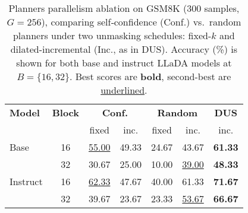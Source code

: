 \begin{table}[!t]
  \centering
  \small
  \setlength{\tabcolsep}{3pt}
  \renewcommand{\arraystretch}{0.9}
  \caption{Planners parallelism ablation on GSM8K (300 samples, $G=256$), comparing self‐confidence (Conf.) vs.\ random planners under two unmasking schedules: fixed-$k$ and dilated-incremental (Inc., as in DUS). Accuracy (\%) is shown for both base and instruct LLaDA models at $B=\{16,32\}$. Best scores are \textbf{bold}, second-best are \underline{underlined}.}
  \label{tab:planners_ablation}

  \begin{tabular}{l c cc cc c}
    \toprule
    \bfseries Model 
      & \bfseries Block 
      & \multicolumn{2}{c}{\bfseries Conf.} 
      & \multicolumn{2}{c}{\bfseries Random} 
      & \bfseries DUS \\
    \cmidrule(lr){3-4}\cmidrule(lr){5-6}
      &  
      & fixed & inc. 
      & fixed & inc. 
      & inc. \\
    \midrule
    Base  
      & 16 & \underline{55.00} & 49.33 & 24.67 & 43.67 & \textbf{61.33} \\
      & 32 & 30.67 & 25.00 & 10.00 & \underline{39.00} & \textbf{48.33} \\
    \midrule
    Instruct  
      & 16 & \underline{62.33} & 47.67 & 40.00 & 61.33 & \textbf{71.67} \\
      & 32 & 39.67 & 23.67 & 23.33 & \underline{53.67} & \textbf{66.67} \\
    \bottomrule
  \end{tabular}
\end{table}
